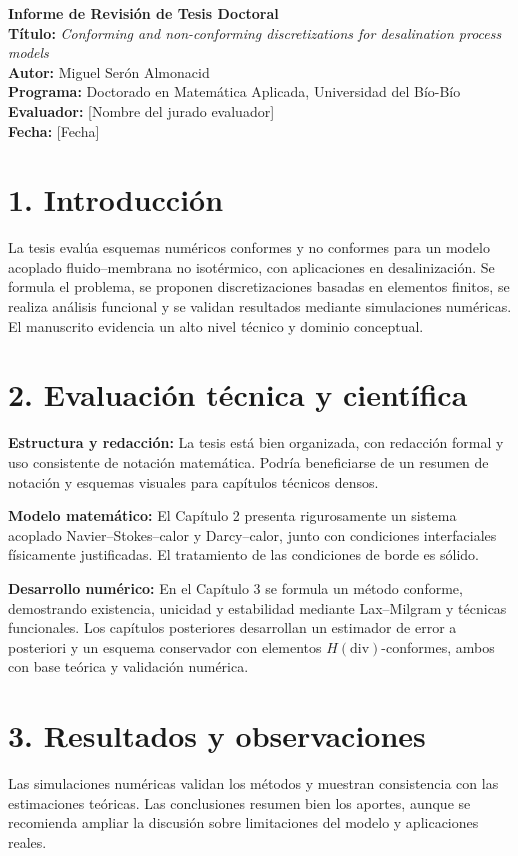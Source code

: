 \documentclass[12pt]{article}
\begin{document}
\begin{center}
\Large\textbf{Informe de Revisión de Tesis Doctoral} \\[0.5cm]
\normalsize
\textbf{Título:} \textit{Conforming and non-conforming discretizations for desalination process models} \\[0.2cm]
\textbf{Autor:} Miguel Serón Almonacid \\[0.2cm]
\textbf{Programa:} Doctorado en Matemática Aplicada, Universidad del Bío-Bío \\[0.2cm]
\textbf{Evaluador:} [Nombre del jurado evaluador] \\[0.2cm]
\textbf{Fecha:} [Fecha] 
\end{center}

\section*{1. Introducción}
La tesis evalúa esquemas numéricos conformes y no conformes para un modelo acoplado fluido–membrana no isotérmico, con aplicaciones en desalinización. Se formula el problema, se proponen discretizaciones basadas en elementos finitos, se realiza análisis funcional y se validan resultados mediante simulaciones numéricas. El manuscrito evidencia un alto nivel técnico y dominio conceptual.

\section*{2. Evaluación técnica y científica}

\textbf{Estructura y redacción:} La tesis está bien organizada, con redacción formal y uso consistente de notación matemática. Podría beneficiarse de un resumen de notación y esquemas visuales para capítulos técnicos densos.

\textbf{Modelo matemático:} El Capítulo 2 presenta rigurosamente un sistema acoplado Navier--Stokes--calor y Darcy--calor, junto con condiciones interfaciales físicamente justificadas. El tratamiento de las condiciones de borde es sólido.

\textbf{Desarrollo numérico:} En el Capítulo 3 se formula un método conforme, demostrando existencia, unicidad y estabilidad mediante Lax--Milgram y técnicas funcionales. Los capítulos posteriores desarrollan un estimador de error a posteriori y un esquema conservador con elementos $H(\text{div})$-conformes, ambos con base teórica y validación numérica.

\section*{3. Resultados y observaciones}
Las simulaciones numéricas validan los métodos y muestran consistencia con las estimaciones teóricas. Las conclusiones resumen bien los aportes, aunque se recomienda ampliar la discusión sobre limitaciones del modelo y aplicaciones reales. 
\end{document}
